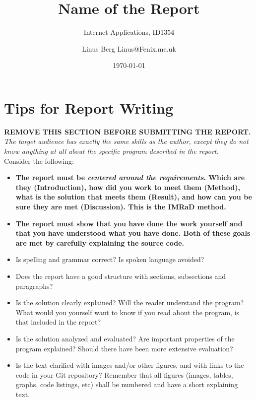\documentclass[a4paper]{scrartcl}
\title{Name of the Report}
\subtitle{Internet Applications, ID1354}
\author{Linus Berg Linus@Fenix.me.uk}
\date{\today}
\begin{document}
\maketitle

\section*{Tips for Report Writing}
\textbf{REMOVE THIS SECTION BEFORE SUBMITTING THE REPORT.}\\

\noindent \textit{The target audience has exactly the same skills as the author, except they do not know anything at all about the specific program described in the report.} \\

Consider the following:

\begin{itemize}
  \item \textbf{The report must be \textit{centered around the requirements}. Which are they (Introduction), how did you work to meet them (Method), what is the solution that meets them (Result), and how can you be sure they are met (Discussion). This is the IMRaD method.}

  \item \textbf{The report must show that you have done the work yourself and that you have understood what you have done. Both of these goals are met by carefully explaining the source code.}

  \item Is spelling and grammar correct? Is spoken language avoided?

  \item Does the report have a good structure with sections, subsections and paragraphs?

  \item Is the solution clearly explained? Will the reader understand the program? What would you yourself want to know if you read about the program, is that included in the report?

  \item Is the solution analyzed and evaluated? Are important properties of the program explained? Should there have been more extensive evaluation?

  \item Is the text clarified with images and/or other figures, and with links to the code in your Git repository? Remember that all figures (images, tables, graphs, code listings, etc) shall be numbered and have a short explaining text.
\end{itemize}
\end{document}
